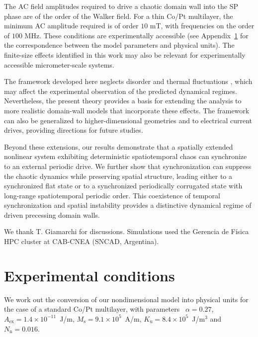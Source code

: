 \documentclass[prb,aps,twocolumn,superscriptaddress,floatfix]{revtex4-1}
\begin{document}
The AC field amplitudes required to drive a chaotic domain wall into the SP phase are of the order of the Walker field. For a thin Co/Pt multilayer, the minimum AC amplitude required is of order $10$ mT, with frequencies on the order of $100$ MHz. These conditions are experimentally accessible (see Appendix~\ref{ap:exp_cond} for the correspondence between the model parameters and physical units). The finite-size effects identified in this work may also be relevant for experimentally accessible micrometer-scale systems.

The framework developed here neglects disorder and thermal fluctuations \cite{ferre2013,ferrero2021creep}, which may affect the experimental observation of the predicted dynamical regimes. Nevertheless, the present theory provides a basis for extending the analysis to more realistic domain-wall models that incorporate these effects. The framework can also be generalized to higher-dimensional geometries and to electrical current drives, providing directions for future studies.

Beyond these extensions, our results demonstrate that a spatially extended nonlinear system exhibiting deterministic spatiotemporal chaos can synchronize to an external periodic drive. We further show that synchronization can suppress the chaotic dynamics while preserving spatial structure, leading either to a synchronized flat state or to a synchronized periodically corrugated state with long-range spatiotemporal periodic order. This coexistence of temporal synchronization and spatial instability provides a distinctive dynamical regime of driven precessing domain walls.

\begin{acknowledgments}
We thank T. Giamarchi for discussions. Simulations used the Gerencia de Física  HPC cluster at CAB-CNEA (SNCAD, Argentina).
\end{acknowledgments}


\appendix

\section{Experimental conditions}
\label{ap:exp_cond}

We work out the conversion of our nondimensional model into physical units for the case of a standard Co/Pt multilayer, with parameters~\cite{skaugen2019} $\alpha=0.27$, $A_\text{ex}=1.4 \times 10^{-11}$~J/m, $M_\text{s}=9.1\times 10^5$~A/m, $K_\text{u}=8.4\times 10 ^5$~J/m$^3$ and $N_\text{n}=0.016$.
\end{document}
